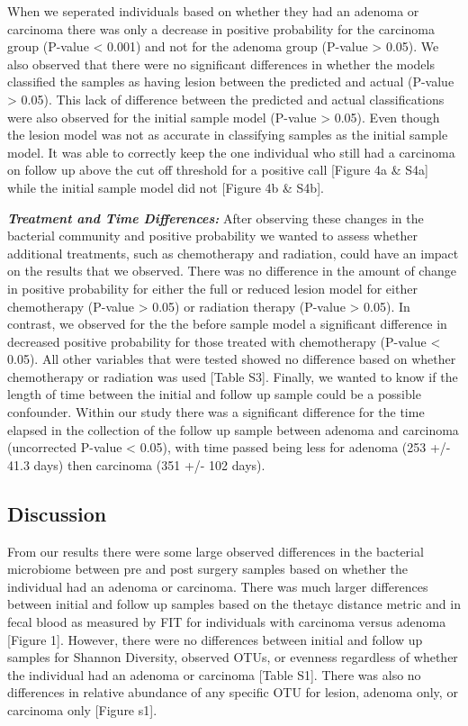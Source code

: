 \documentclass[12pt,]{article}
\begin{document}
When we seperated individuals based on whether they had an adenoma or
carcinoma there was only a decrease in positive probability for the
carcinoma group (P-value \textless{} 0.001) and not for the adenoma
group (P-value \textgreater{} 0.05). We also observed that there were no
significant differences in whether the models classified the samples as
having lesion between the predicted and actual (P-value \textgreater{}
0.05). This lack of difference between the predicted and actual
classifications were also observed for the initial sample model (P-value
\textgreater{} 0.05). Even though the lesion model was not as accurate
in classifying samples as the initial sample model. It was able to
correctly keep the one individual who still had a carcinoma on follow up
above the cut off threshold for a positive call {[}Figure 4a \& S4a{]}
while the initial sample model did not {[}Figure 4b \& S4b{]}.

\textbf{\emph{Treatment and Time Differences:}} After observing these
changes in the bacterial community and positive probability we wanted to
assess whether additional treatments, such as chemotherapy and
radiation, could have an impact on the results that we observed. There
was no difference in the amount of change in positive probability for
either the full or reduced lesion model for either chemotherapy (P-value
\textgreater{} 0.05) or radiation therapy (P-value \textgreater{} 0.05).
In contrast, we observed for the the before sample model a significant
difference in decreased positive probability for those treated with
chemotherapy (P-value \textless{} 0.05). All other variables that were
tested showed no difference based on whether chemotherapy or radiation
was used {[}Table S3{]}. Finally, we wanted to know if the length of
time between the initial and follow up sample could be a possible
confounder. Within our study there was a significant difference for the
time elapsed in the collection of the follow up sample between adenoma
and carcinoma (uncorrected P-value \textless{} 0.05), with time passed
being less for adenoma (253 +/- 41.3 days) then carcinoma (351 +/- 102
days).

\newpage

\subsection{Discussion}\label{discussion}

From our results there were some large observed differences in the
bacterial microbiome between pre and post surgery samples based on
whether the individual had an adenoma or carcinoma. There was much
larger differences between initial and follow up samples based on the
thetayc distance metric and in fecal blood as measured by FIT for
individuals with carcinoma versus adenoma {[}Figure 1{]}. However, there
were no differences between initial and follow up samples for Shannon
Diversity, observed OTUs, or evenness regardless of whether the
individual had an adenoma or carcinoma {[}Table S1{]}. There was also no
differences in relative abundance of any specific OTU for lesion,
adenoma only, or carcinoma only {[}Figure s1{]}.
\end{document}
